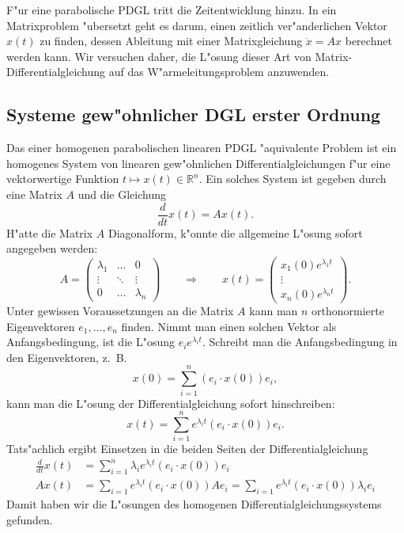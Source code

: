 F"ur eine parabolische PDGL tritt die Zeitentwicklung hinzu. In
ein Matrixproblem "ubersetzt geht es darum, einen zeitlich
ver"anderlichen Vektor $x(t)$ zu finden, dessen Ableitung mit einer
Matrixgleichung $\dot x=Ax$ berechnet werden kann. Wir versuchen daher,
die L"osung dieser Art von Matrix-Differentialgleichung auf das
W"armeleitungsproblem anzuwenden.

\subsection{Systeme gew"ohnlicher DGL erster Ordnung}
Das einer homogenen parabolischen linearen PDGL "aquivalente Problem
ist ein homogenes System
von linearen gew"ohnlichen Differentialgleichungen f"ur eine vektorwertige Funktion
$t\mapsto x(t)\in\mathbb R^n$.
Ein solches System ist gegeben durch eine Matrix $A$ und die Gleichung
\[
\frac{d}{dt}x(t)=Ax(t).
\]
H"atte die Matrix $A$ Diagonalform, k"onnte die allgemeine L"osung 
sofort angegeben werden:
\[
A=\begin{pmatrix}
\lambda_1&\dots&0\\
\vdots&\ddots&\vdots\\
0&\dots&\lambda_n
\end{pmatrix}
\qquad\Rightarrow\qquad
x(t)=\begin{pmatrix}
x_1(0)e^{\lambda_1t}
\\
\vdots
\\
x_n(0)e^{\lambda_nt}
\end{pmatrix}.
\]
Unter gewissen Voraussetzungen an die Matrix $A$ kann man $n$
orthonormierte Eigenvektoren
$e_1,\dots,e_n$ finden. Nimmt man einen solchen Vektor als
Anfangsbedingung, ist die L"osung $e_ie^{\lambda_it}$. Schreibt man die
Anfangsbedingung in den Eigenvektoren, z.~B.
\[
x(0)=\sum_{i=1}^n(e_i \cdot x(0))e_i,
\]
kann man die L"osung der Differentialgleichung sofort hinschreiben:
\begin{equation}
x(t)=\sum_{i=1}^n
e^{\lambda_i t}
(e_i\cdot x(0))e_i
.
\label{development}
\end{equation}
Tats"achlich ergibt Einsetzen in die beiden Seiten der Differentialgleichung
\begin{align*}
\frac{d}{dt}x(t)&=\sum_{i=1}^n\lambda_ie^{\lambda_i t}(e_i\cdot x(0))e_i
\\
Ax(t)
&=\sum_{i=1}e^{\lambda_it}(e_i\cdot x(0))Ae_i
=\sum_{i=1}e^{\lambda_it}(e_i\cdot x(0))\lambda_i e_i
\end{align*}
Damit haben wir die L"osungen des homogenen Differentialgleichungssystems
gefunden.

